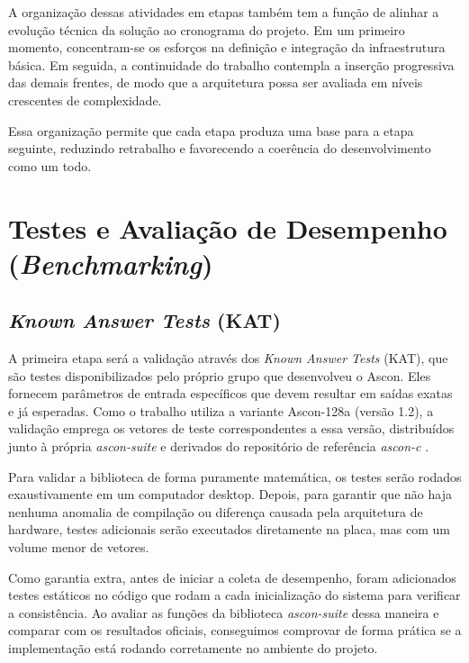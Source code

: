 A organização dessas atividades em etapas também tem a função de alinhar a evolução técnica da solução ao cronograma do projeto. Em um primeiro momento, concentram-se os esforços na definição e integração da infraestrutura básica. Em seguida, a continuidade do trabalho contempla a inserção progressiva das demais frentes, de modo que a arquitetura possa ser avaliada em níveis crescentes de complexidade.

Essa organização permite que cada etapa produza uma base para a etapa seguinte, reduzindo retrabalho e favorecendo a coerência do desenvolvimento como um todo.


\section{Testes e Avaliação de Desempenho (\textit{Benchmarking})}
\label{subsec:validacao-ascon}
\subsection{\textit{Known Answer Tests} (KAT)}
A primeira etapa será a validação através dos \textit{Known Answer Tests} (KAT), que são testes disponibilizados pelo próprio grupo que desenvolveu o Ascon. Eles fornecem parâmetros de entrada específicos que devem resultar em saídas exatas e já esperadas. Como o trabalho utiliza a variante Ascon-128a (versão 1.2), a validação emprega os vetores de teste correspondentes a essa versão, distribuídos junto à própria \textit{ascon-suite} e derivados do repositório de referência \textit{ascon-c} \cite{ascon_reference_c}.

Para validar a biblioteca de forma puramente matemática, os testes serão rodados exaustivamente em um computador desktop. Depois, para garantir que não haja nenhuma anomalia de compilação ou diferença causada pela arquitetura de hardware, testes adicionais serão executados diretamente na placa, mas com um volume menor de vetores.

Como garantia extra, antes de iniciar a coleta de desempenho, foram adicionados testes estáticos no código que rodam a cada inicialização do sistema para verificar a consistência. Ao avaliar as funções da biblioteca \textit{ascon-suite} dessa maneira e comparar com os resultados oficiais, conseguimos comprovar de forma prática se a implementação está rodando corretamente no ambiente do projeto.

